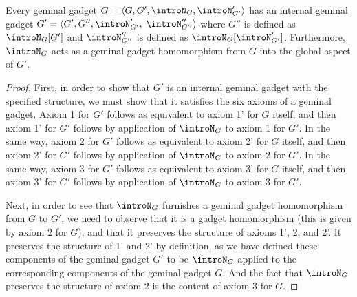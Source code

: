 \begin{theorem}\label{GLContainsGL}
Every geminal gadget $G = \langle G, G', \introN_{G}, \introN'_{G'}\rangle$ has an internal geminal gadget $G' = \langle G', G'', \introN'_{G'},$ $\introN''_{G''}\rangle$ where $G''$ is defined as $\introN_{G}[G']$ and $\introN''_{G''}$ is defined as $\introN_{G}[\introN'_{G'}]$. Furthermore, $\introN_{G}$ acts as a geminal gadget homomorphism from $G$ into the global aspect of $G'$.
\end{theorem}
\begin{proof}
First, in order to show that $G'$ is an internal geminal gadget with the specified structure, we must show that it satisfies the six axioms of a geminal gadget. Axiom 1 for $G'$ follows as equivalent to axiom 1' for $G$ itself, and then axiom 1' for $G'$ follows by application of $\introN_{G}$ to axiom 1 for $G'$. In the same way, axiom 2 for $G'$ follows as equivalent to axiom 2' for $G$ itself, and then axiom 2' for $G'$ follows by application of $\introN_{G}$ to axiom 2 for $G'$. In the same way, axiom 3 for $G'$ follows as equivalent to axiom 3' for $G$ itself, and then axiom 3' for $G'$ follows by application of $\introN_{G}$ to axiom 3 for $G'$.

Next, in order to see that $\introN_{G}$ furnishes a geminal gadget homomorphism from $G$ to $G'$, we need to observe that it is a gadget homomorphism (this is given by axiom 2 for $G$), and that it preserves the structure of axioms 1', 2, and 2'. It preserves the structure of 1' and 2' by definition, as we have defined these components of the geminal gadget $G'$ to be $\introN_{G}$ applied to the corresponding components of the geminal gadget $G$. And the fact that $\introN_{G}$ preserves the structure of axiom 2 is the content of axiom 3 for $G$.
\end{proof}

